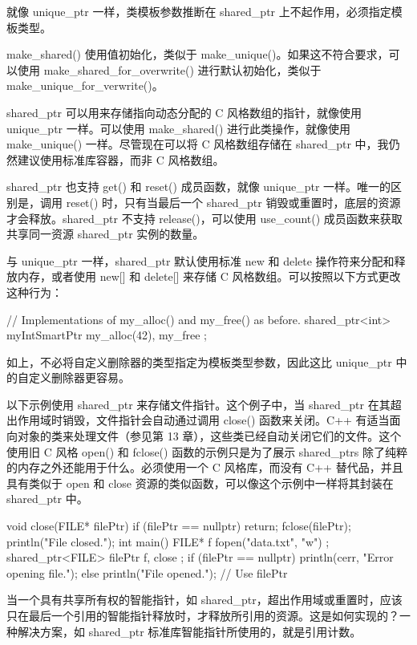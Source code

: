 就像 unique\_ptr 一样，类模板参数推断在 shared\_ptr 上不起作用，必须指定模板类型。

make\_shared() 使用值初始化，类似于 make\_unique()。如果这不符合要求，可以使用 make\_shared\_for\_overwrite() 进行默认初始化，类似于 make\_unique\_for\_verwrite()。

shared\_ptr 可以用来存储指向动态分配的 C 风格数组的指针，就像使用 unique\_ptr 一样。可以使用 make\_shared() 进行此类操作，就像使用 make\_unique() 一样。尽管现在可以将 C 风格数组存储在 shared\_ptr 中，我仍然建议使用标准库容器，而非 C 风格数组。

shared\_ptr 也支持 get() 和 reset() 成员函数，就像 unique\_ptr 一样。唯一的区别是，调用 reset() 时，只有当最后一个 shared\_ptr 销毁或重置时，底层的资源才会释放。shared\_ptr 不支持 release()，可以使用 use\_count() 成员函数来获取共享同一资源 shared\_ptr 实例的数量。

与 unique\_ptr 一样，shared\_ptr 默认使用标准 new 和 delete 操作符来分配和释放内存，或者使用 new[] 和 delete[] 来存储 C 风格数组。可以按照以下方式更改这种行为：

\begin{cpp}
// Implementations of my_alloc() and my_free() as before.
shared_ptr<int> myIntSmartPtr { my_alloc(42), my_free };
\end{cpp}

如上，不必将自定义删除器的类型指定为模板类型参数，因此这比 unique\_ptr 中的自定义删除器更容易。

以下示例使用 shared\_ptr 来存储文件指针。这个例子中，当 shared\_ptr 在其超出作用域时销毁，文件指针会自动通过调用 close() 函数来关闭。C++ 有适当面向对象的类来处理文件（参见第 13 章），这些类已经自动关闭它们的文件。这个使用旧 C 风格 open() 和 fclose() 函数的示例只是为了展示 shared\_ptrs 除了纯粹的内存之外还能用于什么。必须使用一个 C 风格库，而没有 C++ 替代品，并且具有类似于 open 和 close 资源的类似函数，可以像这个示例中一样将其封装在 shared\_ptr 中。

\begin{cpp}
void close(FILE* filePtr)
{
    if (filePtr == nullptr) { return; }
    fclose(filePtr);
    println("File closed.");
}
int main()
{
    FILE* f { fopen("data.txt", "w") };
    shared_ptr<FILE> filePtr { f, close };
    if (filePtr == nullptr) {
        println(cerr, "Error opening file.");
    } else {
        println("File opened.");
        // Use filePtr
    }
}
\end{cpp}


当一个具有共享所有权的智能指针，如 shared\_ptr，超出作用域或重置时，应该只在最后一个引用的智能指针释放时，才释放所引用的资源。这是如何实现的？一种解决方案，如 shared\_ptr 标准库智能指针所使用的，就是引用计数。

